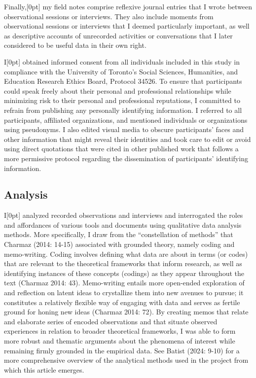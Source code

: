 \documentclass[
]{article}
\newcommand{\paragraphnumber}[1]{\marginnote{\color{lightgray}\tiny{#1}}[0pt]}
\begin{document}
Finally,\paragraphnumber{[20]} my field notes comprise reflexive journal
entries that I wrote between observational sessions or interviews. They
also include moments from observational sessions or interviews that I
deemed particularly important, as well as descriptive accounts of
unrecorded activities or conversations that I later considered to be
useful data in their own right.

I\paragraphnumber{[21]} obtained informed consent from all individuals
included in this study in compliance with the University of Toronto's
Social Sciences, Humanities, and Education Research Ethics Board,
Protocol 34526. To ensure that participants could speak freely about
their personal and professional relationships while minimizing risk to
their personal and professional reputations, I committed to refrain from
publishing any personally identifying information. I referred to all
participants, affiliated organizations, and mentioned individuals or
organizations using pseudonyms. I also edited visual media to obscure
participants' faces and other information that might reveal their
identities and took care to edit or avoid using direct quotations that
were cited in other published work that follows a more permissive
protocol regarding the dissemination of participants' identifying
information.

\subsection{Analysis}\label{analysis}

I\paragraphnumber{[22]} analyzed recorded observations and interviews
and interrogated the roles and affordances of various tools and
documents using qualitative data analysis methods. More specifically, I
draw from the ``constellation of methods'' that Charmaz (2014: 14-15)
associated with grounded theory, namely coding and memo-writing. Coding
involves defining what data are about in terms (or codes) that are
relevant to the theoretical frameworks that inform research, as well as
identifying instances of these concepts (codings) as they appear
throughout the text (Charmaz 2014: 43). Memo-writing entails more
open-ended exploration of and reflection on latent ideas to crystallize
them into new avenues to pursue; it constitutes a relatively flexible
way of engaging with data and serves as fertile ground for honing new
ideas (Charmaz 2014: 72). By creating memos that relate and elaborate
series of encoded observations and that situate observed experiences in
relation to broader theoretical frameworks, I was able to form more
robust and thematic arguments about the phenomena of interest while
remaining firmly grounded in the empirical data. See Batist (2024: 9-10)
for a more comprehensive overview of the analytical methods used in the
project from which this article emerges.
\end{document}
